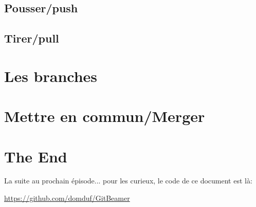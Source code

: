 \documentclass[10pt]{beamer}
\begin{document}
\subsection{Pousser/push}
\subsection{Tirer/pull}


\section{Les branches}

\section{Mettre en commun/Merger}


\section{The End}


\begin{frame}
La suite au prochain épisode...
pour les curieux, le code de ce document est là:

\href{https://github.com/domduf/GitBeamer}{https://github.com/domduf/GitBeamer}
\end{frame}
\end{document}
